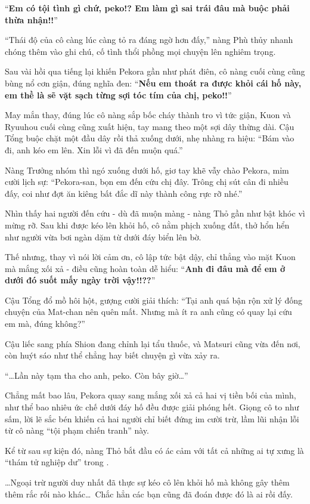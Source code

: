 \documentclass[../main.tex]{subfiles}
\begin{document}
``\textbf{Em có tội tình gì chứ, peko!? Em làm gì sai trái đâu mà buộc phải thừa nhận!!}''

``Thái độ của cô càng lúc càng tỏ ra đáng ngờ hơn đấy,'' nàng Phù thủy nhanh chóng thêm vào ghi chú, cố tình thổi phồng mọi chuyện lên nghiêm trọng.

Sau vài hồi qua tiếng lại khiến Pekora gần như phát điên, cô nàng cuối cùng cũng bùng nổ cơn giận, đúng nghĩa đen: ``\textbf{Nếu em thoát ra được khỏi cái hố này, em thề là sẽ vặt sạch từng sợi tóc tím của chị, peko!!}''

May mắn thay, đúng lúc cô nàng sắp bốc cháy thành tro vì tức giận, Kuon và Ryuuhou cuối cùng cũng xuất hiện, tay mang theo một sợi dây thừng dài. Cậu Tổng buộc chặt một đầu dây rồi thả xuống dưới, nhẹ nhàng ra hiệu: ``Bám vào đi, anh kéo em lên. Xin lỗi vì đã đến muộn quá.''

Nàng Trưởng nhóm thì ngó xuống dưới hố, giơ tay khẽ vẫy chào Pekora, mỉm cười lịch sự: ``Pekora-san, bọn em đến cứu chị đây. Trông chị sút cân đi nhiều đấy, coi như đợt ăn kiêng bất đắc dĩ này thành công rực rỡ nhé.''

Nhìn thấy hai người đến cứu - dù đã muộn màng - nàng Thỏ gần như bật khóc vì mừng rỡ. Sau khi được kéo lên khỏi hố, cô nằm phịch xuống đất, thở hổn hển như người vừa bơi ngàn dặm từ dưới đáy biển lên bờ.

Thế nhưng, thay vì nói lời cảm ơn, cô lập tức bật dậy, chỉ thẳng vào mặt Kuon mà mắng xối xả - điều cũng hoàn toàn dễ hiểu: ``\textbf{Anh đi đâu mà để em ở dưới đó suốt mấy ngày trời vậy!!??}''

Cậu Tổng đổ mồ hôi hột, gượng cười giải thích: ``Tại anh quá bận rộn xử lý đống chuyện của Mat-chan nên quên mất. Nhưng mà ít ra anh cũng có quay lại cứu em mà, đúng không?''

Cậu liếc sang phía Shion đang chỉnh lại tẩu thuốc, và Matsuri cũng vừa đến nơi, còn huýt sáo như thể chẳng hay biết chuyện gì vừa xảy ra.

``\dots Lần này tạm tha cho anh, peko. Còn bây giờ\dots''

Chẳng mất bao lâu, Pekora quay sang mắng xối xả cả hai vị tiền bối của mình, như thể bao nhiêu ức chế dưới đáy hố đều được giải phóng hết. Giọng cô to như sấm, lời lẽ sắc bén khiến cả hai người chỉ biết đứng im cười trừ, lầm lũi nhận lỗi từ cô nàng ``tội phạm chiến tranh'' này.

Kể từ sau sự kiện đó, nàng Thỏ bắt đầu có ác cảm với tất cả những ai tự xưng là ``thám tử nghiệp dư'' trong \hll.

\dots Ngoại trừ người duy nhất đã thực sự kéo cô lên khỏi hố mà không gây thêm thêm rắc rối nào khác\dots\ Chắc hẳn các bạn cũng đã đoán được đó là ai rồi đấy.
\end{document}
